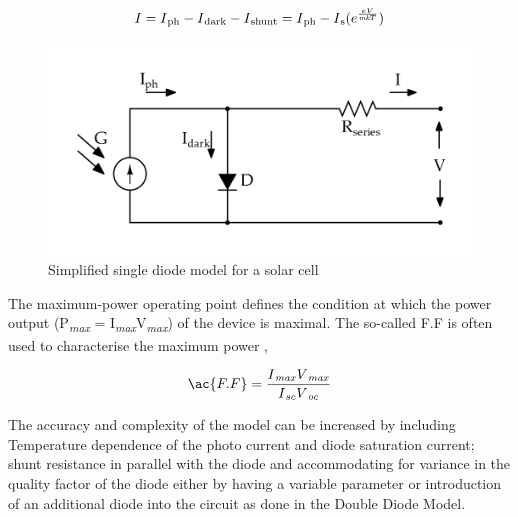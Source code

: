     \begin{equation}
    \begin{aligned}
     I = I\textsubscript{ph} - I\textsubscript{dark} - I\textsubscript{shunt} = I\textsubscript{ph} -  I\textsubscript{s} (e^{\frac{eV}{\textit{mk}T}})
      \label{eq:equ_new_cell_current}
      \end{aligned}
      \end{equation}
  
     
 \begin{figure}[H]
   \begin{center}
   \includegraphics[width=\textwidth]{images/simplified_single_diode_model_simple}
   \caption{ Simplified single diode model for a solar cell }
   \label{fig:simple_EQu_cell}
   \end{center}
   \end{figure}

The maximum-power operating point defines the condition at which the power output (P\textsubscript{\textit{max}} = I\textsubscript{\textit{max}}V\textsubscript{\textit{max}}) of the device is maximal.
The so-called \ac{F.F} is often used to characterise the maximum power ,

\begin{equation}
 \begin{aligned}
  \ac{F.F} = \dfrac{I\textsubscript{\textit{max}}V\textsubscript{\textit{max}}}{I\textsubscript{\textit{sc}}V\textsubscript{\textit{oc}}}
   \label{eq:equ_current_new}
   \end{aligned}
   \end{equation}
   
The accuracy and complexity of the model can be increased by including Temperature dependence of the photo current and diode saturation current; shunt resistance in parallel with the diode and accommodating for variance in the quality factor of the diode either by having a variable parameter or introduction of an additional diode into the circuit as done in the Double Diode Model.


